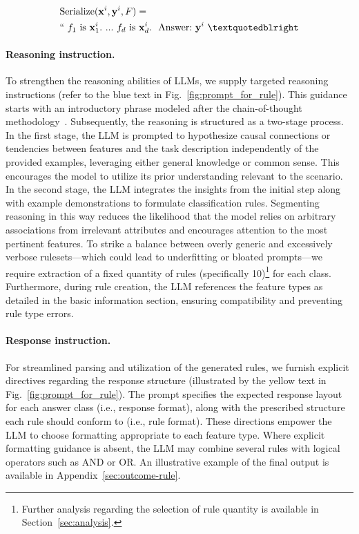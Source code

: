 \begin{align}
&\text{Serialize}(\mathbf{x}^i,\mathbf{y}^i, F) = \nonumber \\ 
&``\ f_1\ \text{is}\ \mathbf{x}^i_1.\ ... \ f_d\  \text{is}\  \mathbf{x}^i_d.\ \ \text{Answer:}\  \mathbf{y}^i\ ”
\end{align}

\vspace*{-0.12in}
\paragraph{Reasoning instruction.} To strengthen the reasoning abilities of LLMs, we supply targeted reasoning instructions (refer to the blue text in Fig.~\ref{fig:prompt_for_rule}). This guidance starts with an introductory phrase modeled after the chain-of-thought methodology~\cite{wei2022chain}. Subsequently, the reasoning is structured as a two-stage process. In the first stage, the LLM is prompted to hypothesize causal connections or tendencies between features and the task description independently of the provided examples, leveraging either general knowledge or common sense. This encourages the model to utilize its prior understanding relevant to the scenario. In the second stage, the LLM integrates the insights from the initial step along with example demonstrations to formulate classification rules. Segmenting reasoning in this way reduces the likelihood that the model relies on arbitrary associations from irrelevant attributes and encourages attention to the most pertinent features. To strike a balance between overly generic and excessively verbose rulesets—which could lead to underfitting or bloated prompts—we require extraction of a fixed quantity of rules (specifically 10)\footnote{Further analysis regarding the selection of rule quantity is available in Section~\ref{sec:analysis}.} for each class. Furthermore, during rule creation, the LLM references the feature types as detailed in the basic information section, ensuring compatibility and preventing rule type errors. 

\vspace*{-0.12in}
\paragraph{Response instruction.} For streamlined parsing and utilization of the generated rules, we furnish explicit directives regarding the response structure (illustrated by the yellow text in Fig.~\ref{fig:prompt_for_rule}). The prompt specifies the expected response layout for each answer class (i.e., response format), along with the prescribed structure each rule should conform to (i.e., rule format). These directions empower the LLM to choose formatting appropriate to each feature type. Where explicit formatting guidance is absent, the LLM may combine several rules with logical operators such as AND or OR. An illustrative example of the final output is available in Appendix~\ref{sec:outcome-rule}.

